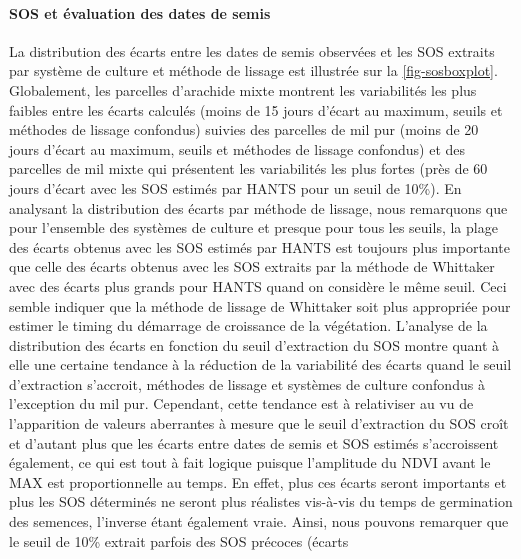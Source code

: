\paragraph{SOS et évaluation des dates de semis}
La distribution des écarts entre les dates de semis observées et les SOS extraits par système de culture et méthode de lissage est illustrée sur la \cref{fig-sosboxplot}. Globalement, les parcelles d'arachide mixte montrent les variabilités les plus faibles entre les écarts calculés (moins de 15 jours d'écart au maximum, seuils et méthodes de lissage confondus) suivies des parcelles de mil pur (moins de 20 jours d'écart au maximum, seuils et méthodes de lissage confondus) et des parcelles de mil mixte qui présentent les variabilités les plus fortes (près de 60 jours d'écart avec les SOS estimés par HANTS pour un seuil de 10\%). En analysant la distribution des écarts par méthode de lissage, nous remarquons que pour l'ensemble des systèmes de culture et presque pour tous les seuils, la plage des écarts obtenus avec les SOS estimés par HANTS est toujours plus importante que celle des écarts obtenus avec les SOS extraits par la méthode de Whittaker avec des écarts plus grands pour HANTS quand on considère le même seuil. Ceci semble indiquer que la méthode de lissage de Whittaker soit plus appropriée pour estimer le timing du démarrage de croissance de la végétation. L'analyse de la distribution des écarts en fonction du seuil d'extraction du SOS montre quant à elle une certaine tendance à la réduction de la variabilité des écarts quand le seuil d'extraction s'accroit, méthodes de lissage et systèmes de culture confondus à l'exception du mil pur. Cependant, cette tendance est à relativiser au vu de l'apparition de valeurs aberrantes à mesure que le seuil d'extraction du SOS croît et d'autant plus que les écarts entre dates de semis et SOS estimés s'accroissent également, ce qui est tout à fait logique puisque l'amplitude du NDVI avant le MAX est proportionnelle au temps. En effet, plus ces écarts seront importants et plus les SOS déterminés ne seront plus réalistes vis-à-vis du temps de germination des semences, l'inverse étant également vraie. 
Ainsi, nous pouvons remarquer que le seuil de 10\% extrait parfois des SOS précoces (écarts 
